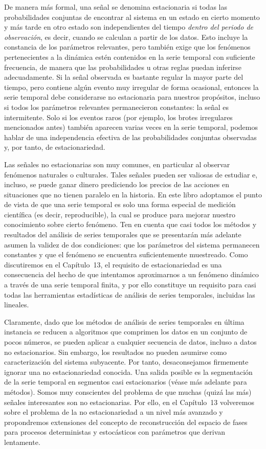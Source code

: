 \documentclass[10pt,a4paper]{book}
\begin{document}
\bigskip

De manera más formal, una señal se denomina estacionaria si todas las probabilidades conjuntas de encontrar al sistema en un estado en cierto momento y más tarde en otro estado son independientes del tiempo \emph{dentro del periodo de observación}, es decir, cuando se calculan a partir de los datos. Esto incluye la constancia de los parámetros relevantes, pero también exige que los fenómenos pertenecientes a la dinámica estén contenidos en la serie temporal con suficiente frecuencia, de manera que las probabilidades u otras reglas puedan inferirse adecuadamente. Si la señal observada es bastante regular la mayor parte del tiempo, pero contiene algún evento muy irregular de forma ocasional, entonces la serie temporal debe considerarse no estacionaria para nuestros propósitos, incluso si todos los parámetros relevantes permanecieron constantes: la señal es intermitente. Solo si los eventos raros (por ejemplo, los brotes irregulares mencionados antes) también aparecen varias veces en la serie temporal, podemos hablar de una independencia efectiva de las probabilidades conjuntas observadas y, por tanto, de estacionariedad.

\bigskip

Las señales no estacionarias son muy comunes, en particular al observar fenómenos naturales o culturales. Tales señales pueden ser valiosas de estudiar e, incluso, se puede ganar dinero prediciendo los precios de las acciones en situaciones que no tienen paralelo en la historia. En este libro adoptamos el punto de vista de que una serie temporal es solo una forma especial de medición científica (es decir, reproducible), la cual se produce para mejorar nuestro conocimiento sobre cierto fenómeno. Ten en cuenta que casi todos los métodos y resultados del análisis de series temporales que se presentarán más adelante asumen la validez de dos condiciones: que los parámetros del sistema permanecen constantes y que el fenómeno se encuentra suficientemente muestreado. Como discutiremos en el Capítulo~13, el requisito de estacionariedad es una consecuencia del hecho de que intentamos aproximarnos a un fenómeno dinámico a través de una serie temporal finita, y por ello constituye un requisito para casi todas las herramientas estadísticas de análisis de series temporales, incluidas las lineales. 

Claramente, dado que los métodos de análisis de series temporales en última instancia se reducen a algoritmos que comprimen los datos en un conjunto de pocos números, se pueden aplicar a cualquier secuencia de datos, incluso a datos no estacionarios. Sin embargo, los resultados no pueden asumirse como caracterización del sistema subyacente. Por tanto, desaconsejamos firmemente ignorar una no estacionariedad conocida. Una salida posible es la segmentación de la serie temporal en segmentos casi estacionarios (véase más adelante para métodos). Somos muy conscientes del problema de que muchas (quizá las más) señales interesantes son no estacionarias. Por ello, en el Capítulo~13 volveremos sobre el problema de la no estacionariedad a un nivel más avanzado y propondremos extensiones del concepto de reconstrucción del espacio de fases para procesos deterministas y estocásticos con parámetros que derivan lentamente.
\end{document}
